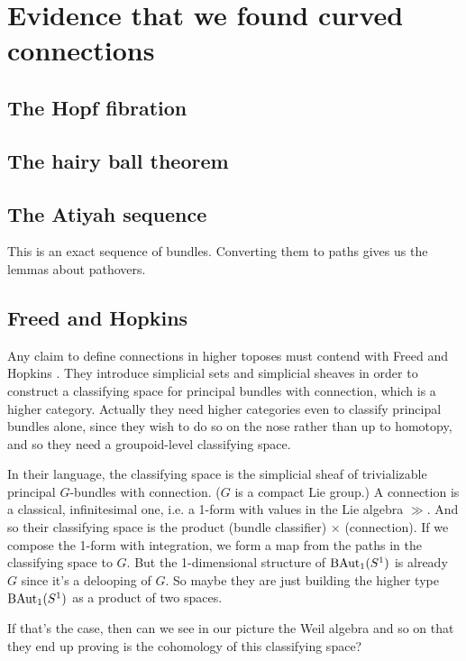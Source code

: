 \documentclass[12pt]{article}
\begin{document}
\section{Evidence that we found curved connections}

\subsection{The Hopf fibration}

\subsection{The hairy ball theorem}

\subsection{The Atiyah sequence}

This is an exact sequence of bundles. Converting them to paths gives us the lemmas about pathovers.

\subsection{Freed and Hopkins}
Any claim to define connections in higher toposes must contend with Freed and Hopkins \cite{freed2013chernweil}. They introduce simplicial sets and simplicial sheaves in order to construct a classifying space for principal bundles with connection, which is a higher category. Actually they need higher categories even to classify principal bundles alone, since they wish to do so on the nose rather than up to homotopy, and so they need a groupoid-level classifying space.

In their language, the classifying space is the simplicial sheaf of trivializable principal \( G \)-bundles with connection. (\( G \) is a compact Lie group.) A connection is a classical, infinitesimal one, i.e. a 1-form with values in the Lie algebra \( \gg \). And so their classifying space is the product (bundle classifier) \( \times \) (connection). If we compose the 1-form with integration, we form a map from the paths in the classifying space to \( G \). But the 1-dimensional structure of \( \mathrm{BAut}_1(S^1) \) is already \( G \) since it's a delooping of \( G \). So maybe they are just building the higher type \( \mathrm{BAut}_1(S^1) \) as a product of two spaces.

If that's the case, then can we see in our picture the Weil algebra and so on that they end up proving is the cohomology of this classifying space?
\end{document}
